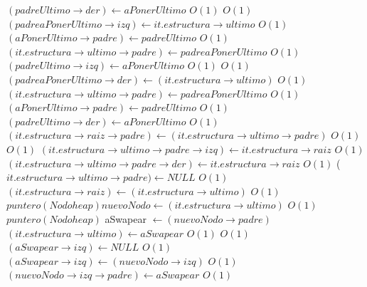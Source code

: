 \begin{Algoritmos}
\begin{algorithmic}[1]
			 		\State $(padreUltimo \rightarrow der) \gets aPonerUltimo$ \Comment $O(1)$
			 		\Else
			 			 \Comment $O(1)$
			 			\State $(padreaPonerUltimo \rightarrow izq) \gets it.estructura \rightarrow ultimo$ \Comment $O(1)$
			 			\State $(aPonerUltimo \rightarrow padre) \gets padreUltimo$ \Comment $O(1)$
			 			\State $(it.estructura \rightarrow ultimo \rightarrow padre) \gets padreaPonerUltimo$ \Comment $O(1)$
			 			\State $(padreUltimo \rightarrow izq) \gets aPonerUltimo$ \Comment $O(1)$
			 			\Else
			 				 \Comment $O(1)$
			 				\State $(padreaPonerUltimo \rightarrow der) \gets (it.estructura \rightarrow ultimo)$ \Comment $O(1)$
			 				\State $(it.estructura \rightarrow ultimo \rightarrow padre) \gets padreaPonerUltimo$ \Comment $O(1)$
			 				\State $(aPonerUltimo \rightarrow padre) \gets padreUltimo$ \Comment $O(1)$
			 				\State $(padreUltimo \rightarrow der) \gets aPonerUltimo$ \Comment $O(1)$
			 				\EndIf
			 			\EndIf
			 		\EndIf
			 	\EndIf
			\Else
				\State $(it.estructura \rightarrow raiz \rightarrow padre) \gets (it.estructura \rightarrow ultimo \rightarrow padre)$ \Comment $O(1)$
				 \Comment $O(1)$
					\State $(it.estructura \rightarrow ultimo \rightarrow padre \rightarrow izq) \gets it.estructura \rightarrow raiz$ \Comment $O(1)$
				\Else
					\State $(it.estructura \rightarrow ultimo \rightarrow padre \rightarrow der) \gets it.estructura \rightarrow raiz$ \Comment $O(1)$
				\EndIf			
				\State ($it.estructura \rightarrow ultimo \rightarrow padre) \gets NULL$ \Comment $O(1)$
				\State $(it.estructura \rightarrow raiz) \gets (it.estructura \rightarrow ultimo)$ \Comment $O(1)$
			\EndIf
	\Else
		\State $puntero(Nodoheap) nuevoNodo \gets (it.estructura \rightarrow ultimo)$ \Comment $O(1)$		
		\State $puntero(Nodoheap)$ aSwapear $\gets (nuevoNodo \rightarrow padre)$
    			\State $(it.estructura \rightarrow ultimo) \gets aSwapear$
    		\EndIf
			 \Comment $O(1)$
						 \Comment $O(1)$
								\State $(aSwapear \rightarrow izq) \gets NULL$ \Comment $O(1)$
							\Else
								\State $(aSwapear \rightarrow izq) \gets (nuevoNodo \rightarrow izq)$ \Comment $O(1)$
								\State $(nuevoNodo \rightarrow izq \rightarrow padre) \gets aSwapear$ \Comment $O(1)$

\end{algorithmic}
\end{Algoritmos}
